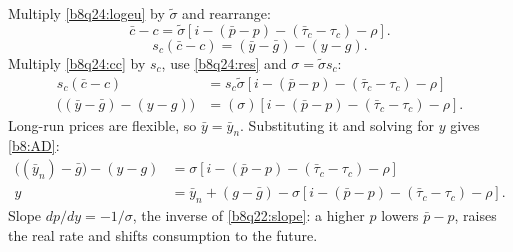 \begin{sol}
\begin{equation}
\end{equation}
Multiply \eqref{b8q24:logeu} by $\tilde\sigma$ and rearrange:
\begin{equation}
\bar c-c=\tilde\sigma[i-(\bar p-p)-(\bar\tau_c-\tau_c)-\rho]. \label{b8q24:cc}
\end{equation}
\begin{equation}
s_c(\bar c-c)=(\bar y-\bar g)-(y-g). \label{b8q24:res}
\end{equation}
Multiply \eqref{b8q24:cc} by $s_c$, use \eqref{b8q24:res} and $\sigma=\tilde\sigma s_c$:
\begin{align*}
s_c(\bar c-c)&=s_c\tilde\sigma[i-(\bar p-p)-(\bar\tau_c-\tau_c)-\rho]\\
\big((\bar y-\bar g)-(y-g)\big)&=(\sigma)[i-(\bar p-p)-(\bar\tau_c-\tau_c)-\rho].
\end{align*}
Long-run prices are flexible, so $\bar y=\bar y_n$. Substituting it and solving for $y$ gives \eqref{b8:AD}:
\begin{align*}
\big((\bar y_n)-\bar g\big)-(y-g)&=\sigma[i-(\bar p-p)-(\bar\tau_c-\tau_c)-\rho]\\
y&=\bar y_n+(g-\bar g)-\sigma[i-(\bar p-p)-(\bar\tau_c-\tau_c)-\rho].
\end{align*}
Slope $dp/dy=-1/\sigma$, the inverse of \eqref{b8q22:slope}: a higher $p$ lowers $\bar p-p$, raises the real rate and shifts consumption to the future.
\end{sol}

